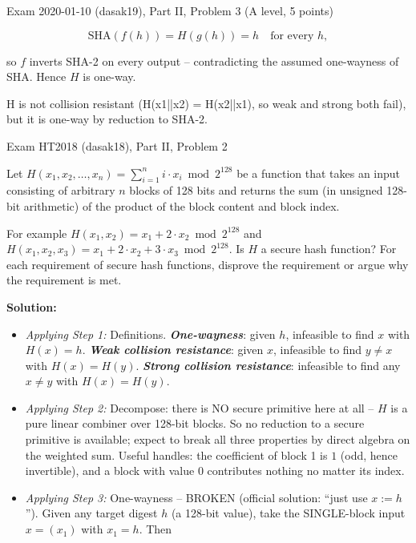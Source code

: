 \documentclass[12pt, a4paper]{article}
\newcommand{\term}[1]{\textbf{\textit{#1}}}        %
\begin{document}
\begin{practicebox}{Exam 2020-01-10 (dasak19), Part II, Problem 3 (A level, 5 points)}
\begin{itemize}
\[
\mathrm{SHA}(f(h)) = H(g(h)) = h \quad \text{for every } h,
\]

so $f$ inverts SHA-2 on every output -- contradicting the assumed one-wayness of SHA. Hence $H$ is one-way.
\end{itemize}

\begin{answerbox}
H is not collision resistant (H(x1||x2) = H(x2||x1), so weak and strong both fail), but it is one-way by reduction to SHA-2.
\end{answerbox}
\end{practicebox}

\begin{practicebox}{Exam HT2018 (dasak18), Part II, Problem 2}
\begin{problembox}
Let $H(x_1, x_2, \dots, x_n) = \sum_{i=1}^{n} i \cdot x_i \bmod 2^{128}$ be a function that takes an input consisting of arbitrary $n$ blocks of 128 bits and returns the sum (in unsigned 128-bit arithmetic) of the product of the block content and block index.

For example $H(x_1, x_2) = x_1 + 2 \cdot x_2 \bmod 2^{128}$ and $H(x_1, x_2, x_3) = x_1 + 2 \cdot x_2 + 3 \cdot x_3 \bmod 2^{128}$. Is $H$ a secure hash function? For each requirement of secure hash functions, disprove the requirement or argue why the requirement is met.
\end{problembox}

\textbf{Solution:}
\begin{itemize}
    \item \textit{Applying Step 1:} Definitions. \term{One-wayness}: given $h$, infeasible to find $x$ with $H(x) = h$. \term{Weak collision resistance}: given $x$, infeasible to find $y \neq x$ with $H(x) = H(y)$. \term{Strong collision resistance}: infeasible to find any $x \neq y$ with $H(x) = H(y)$.
    \item \textit{Applying Step 2:} Decompose: there is NO secure primitive here at all -- $H$ is a pure linear combiner over 128-bit blocks. So no reduction to a secure primitive is available; expect to break all three properties by direct algebra on the weighted sum.
    Useful handles: the coefficient of block 1 is $1$ (odd, hence invertible), and a block with value $0$ contributes nothing no matter its index.
    \item \textit{Applying Step 3:} One-wayness -- BROKEN (official solution: ``just use $x := h$''). Given any target digest $h$ (a 128-bit value), take the SINGLE-block input $x = (x_1)$ with $x_1 = h$. Then


\end{itemize}
\end{practicebox}
\end{document}
